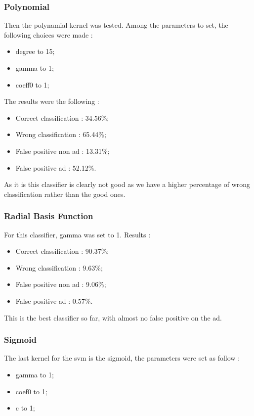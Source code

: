 \subsubsection{Polynomial}

Then the polynamial kernel was tested. Among the parameters to set, the following choices were made :
\begin{itemize}
  \item degree to 15;
  \item gamma to 1;
  \item coeff0 to 1;
\end{itemize}

The results were the following :

\begin{itemize}
  \item Correct classification : 34.56\%;
  \item Wrong classification : 65.44\%;
  \item False positive non ad : 13.31\%;
  \item False positive ad : 52.12\%.
\end{itemize}

As it is this classifier is clearly not good as we have a higher percentage of wrong classification rather than the good ones.

\subsubsection{Radial Basis Function}

For this classifier, gamma was set to 1.
Results :
\begin{itemize}
  \item Correct classification : 90.37\%;
  \item Wrong classification : 9.63\%;
  \item False positive non ad : 9.06\%;
  \item False positive ad : 0.57\%.
\end{itemize}

This is the best classifier so far, with almost no false positive on the ad.


\subsubsection{Sigmoid}

The last kernel for the svm is the sigmoid, the parameters were set as follow :
\begin{itemize}
  \item gamma to 1;
  \item coef0 to 1;
  \item c to 1;
\end{itemize}

